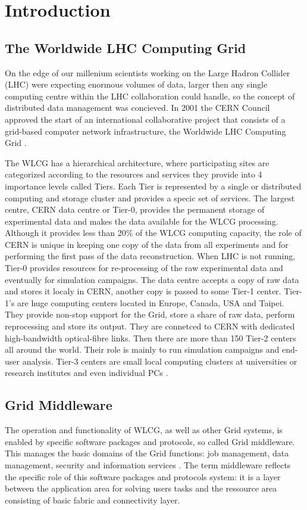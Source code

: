 \chapter*{Introduction}

\section*{The Worldwide LHC Computing Grid}
On the edge of our millenium scientists working on the Large Hadron Collider (LHC) were expecting enormous volumes of data, larger then any single computing centre within the LHC collaboration could handle, so the concept of distributed data management was concieved. In 2001 the CERN Council approved the start of an international collaborative project that consists of a grid-based computer network infrastructure, the Worldwide LHC Computing Grid \cite{happyBday}. 

The WLCG has a hierarchical architecture, where participating sites are categorized according to the resources and services they provide into 4 importance levels called Tiers. Each Tier is represented by a single or distributed computing and storage cluster and provides a specic set of services. The largest centre, CERN data centre or Tier-0, provides the  permanent storage of experimental data and makes the data available for the WLCG processing. Although it provides less than 20\% of the WLCG computing capacity, the role of CERN is unique in keeping one copy of the data from all experiments and for performing the first pass of the data reconstruction. When LHC is not running, Tier-0 provides resources for re-processing of the raw experimental data and eventually for simulation campaigns. The data centre accepts a copy of raw data and stores it localy in CERN, another copy is passed to some Tier-1 center. Tier-1's are huge computing centers located in Europe, Canada, USA and Taipei. They provide non-stop support for the Grid, store a share of raw data, perform reprocessing and store its output. They are connetced to CERN with dedicated high-bandwidth optical-fibre links. Then there are more than 150 Tier-2 centers all around the world. Their role is mainly to run simulation campaigns and end-user analysis. Tier-3 centers are small local computing clusters at universities or research institutes and even individual PCs \cite{TGrid}.

\section*{Grid Middleware}
The operation and functionality of WLCG, as well as other Grid systems, is enabled by specific software packages and protocols, so called Grid middleware. This manages the basic domains of the Grid functions: job management, data management, security and information services \cite{GriCom}. The term middleware reflects the specific role of this software packages and protocols system: it is a layer between  the application area for solving users tasks and the ressource area consisting of basic fabric and connectivity layer. 

